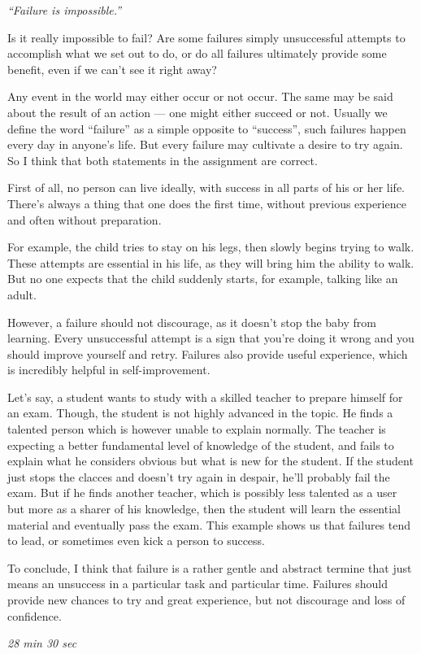 \documentclass[12pt,a4paper]{article}
\begin{document}
\textit{``Failure is impossible.''}

Is it really impossible to fail? Are some failures simply unsuccessful attempts to accomplish what we set out to do, or do all failures ultimately provide some benefit, even if we can't see it right away?

\vspace{3mm}
\hline
\vspace{5mm}

Any event in the world may either occur or not occur. The same may be said about the result of an action --- one might either succeed or not. Usually we define the word ``failure'' as a simple opposite to ``success'', such failures happen every day in anyone's life. But every failure may cultivate a desire to try again. So I think that both statements in the assignment are correct.

First of all, no person can live ideally, with success in all parts of his or her life. There's always a thing that one does the first time, without previous experience and often without preparation.

For example, the child tries to stay on his legs, then slowly begins trying to walk. These attempts are essential in his life, as they will bring him the ability to walk. But no one expects that the child suddenly starts, for example, talking like an adult.

However, a failure should not discourage, as it doesn't stop the baby from learning. Every unsuccessful attempt is a sign that you're doing it wrong and you should improve yourself and retry. Failures also provide useful experience, which is incredibly helpful in self-improvement.

Let's say, a student wants to study with a skilled teacher to prepare himself for an exam. Though, the student is not highly advanced in the topic. He finds a talented person which is however unable to explain normally. The teacher is expecting a better fundamental level of knowledge of the student, and fails to explain what he considers obvious but what is new for the student. If the student just stops the clacces and doesn't try again in despair, he'll probably fail the exam. But if he finds another teacher, which is possibly less talented as a user but more as a sharer of his knowledge, then the student will learn the essential material and eventually pass the exam. This example shows us that failures tend to lead, or sometimes even kick a person to success.

To conclude, I think that failure is a rather gentle and abstract termine that just means an unsuccess in a particular task and particular time. Failures should provide new chances to try and great experience, but not discourage and loss of confidence.

\textit{28 min 30 sec}
\end{document}
